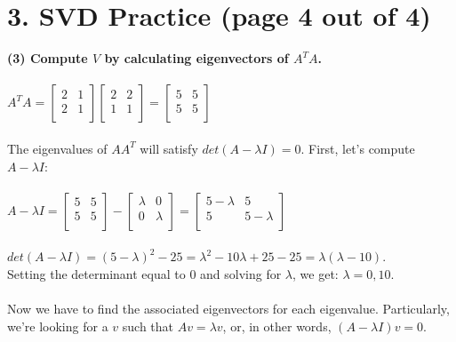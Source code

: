 \documentclass[11pt]{article}
\begin{document}
\newpage

\section*{3. SVD Practice (page 4 out of 4)}
\textbf{(3) Compute $V$ by calculating eigenvectors of $A^TA$.}
\\\\
$A^T A= \begin{bmatrix}
2 & 1 \\
2 & 1 \\
\end{bmatrix} \begin{bmatrix}
2 & 2 \\
1 & 1 \\
\end{bmatrix} = \begin{bmatrix}
5 & 5 \\
5 & 5 \\
\end{bmatrix} $ \\\\
The eigenvalues of $AA^T$ will satisfy $det(A - \lambda I ) = 0$. First, let's compute $A - \lambda I$: \\\\
$ A - \lambda I = \begin{bmatrix}
5 & 5 \\
5 & 5 \\
\end{bmatrix} - \begin{bmatrix}
\lambda & 0 \\
0 & \lambda \\
\end{bmatrix} = \begin{bmatrix}
5 - \lambda & 5 \\
5 & 5 - \lambda \\
\end{bmatrix}$ \\\\
$det(A - \lambda I) = (5 - \lambda)^2 - 25 = \lambda^2 - 10\lambda + 25 - 25 = \lambda(\lambda - 10)$. \\
Setting the determinant equal to 0 and solving for $\lambda$, we get: $\lambda = 0, 10.$ \\\\
Now we have to find the associated eigenvectors for each eigenvalue. Particularly, we're looking for a $v$ such that $Av = \lambda v$, or, in other words, $(A - \lambda I)v = 0$. \\\\
\end{document}
